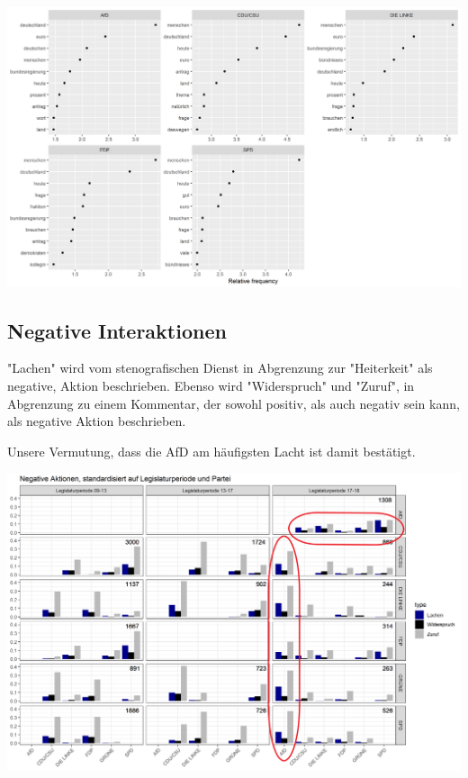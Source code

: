 \includegraphics[width=\linewidth]{Grafiken/17_HäufigsteWörter.png}\\

\subsection{Negative Interaktionen}

"Lachen" wird vom stenografischen Dienst in Abgrenzung zur "Heiterkeit" als negative, Aktion beschrieben. Ebenso wird "Widerspruch" und "Zuruf", in Abgrenzung zu einem Kommentar, der sowohl positiv, als auch negativ sein kann, als negative Aktion beschrieben. 


Unsere Vermutung, dass die AfD am häufigsten Lacht ist damit bestätigt. 

\includegraphics[width=\linewidth]{Grafiken/13_17negativ_perc_bunt.png}\\

